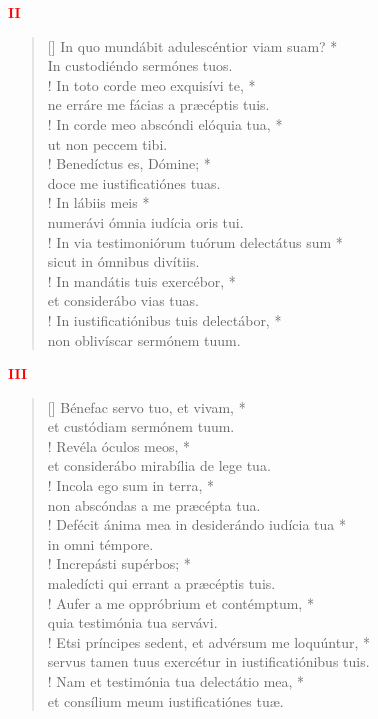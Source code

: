 \begin{center}
\textcolor{red}{\bf II}
\end{center}
\begin{verse}[\versewidth]
In quo mundábit adulescéntior viam suam? *\\
In custodiéndo sermónes tuos.\\!
\vin In toto corde meo exquisívi te, *\\
\vin ne erráre me fácias a præcéptis tuis.\\!
In corde meo abscóndi elóquia tua, *\\
ut non peccem tibi.\\!
\vin Benedíctus es, Dómine; *\\
\vin doce me iustificatiónes tuas.\\!
In lábiis meis *\\
numerávi ómnia iudícia oris tui.\\!
\vin In via testimoniórum tuórum delectátus sum *\\
\vin sicut in ómnibus divítiis.\\!
In mandátis tuis exercébor, *\\
et considerábo vias tuas.\\!
\vin In iustificatiónibus tuis delectábor, *\\
\vin non oblivíscar sermónem tuum.\\
\end{verse}
\begin{center}
\textcolor{red}{\bf III}\\
\end{center}
\begin{verse}[\versewidth]
Bénefac servo tuo, et vivam, *\\
et custódiam sermónem tuum.\\!
\vin Revéla óculos meos, *\\
\vin et considerábo mirabília de lege tua.\\!
Incola ego sum in terra, *\\
non abscóndas a me præcépta tua.\\!
\vin Defécit ánima mea in desiderándo iudícia tua *\\
\vin in omni témpore.\\!
Increpásti supérbos; *\\
maledícti qui errant a præcéptis tuis.\\!
\vin Aufer a me oppróbrium et contémptum, *\\
\vin quia testimónia tua servávi.\\!
Etsi príncipes sedent, et advérsum me loquúntur, *\\
servus tamen tuus exercétur in iustificatiónibus tuis.\\!
\vin Nam et testimónia tua delectátio mea, *\\
\vin et consílium meum iustificatiónes tuæ.\\
\end{verse}
